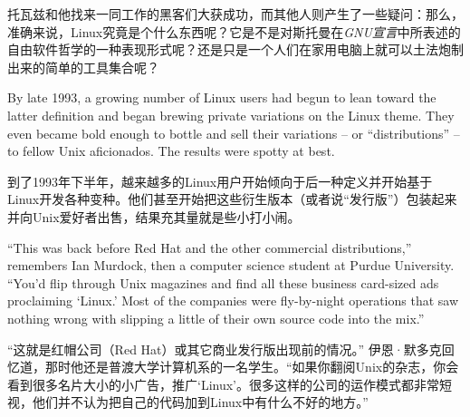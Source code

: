 \ifdefined\chs
托瓦兹和他找来一同工作的黑客们大获成功，而其他人则产生了一些疑问：那么，准确来说，Linux究竟是个什么东西呢？它是不是对斯托曼在\textit{GNU宣言}中所表述的自由软件哲学的一种表现形式呢？还是只是一个人们在家用电脑上就可以土法炮制出来的简单的工具集合呢？
\fi

\ifdefined\eng
By late 1993, a growing number of Linux users had begun to lean toward the latter definition and began brewing private variations on the Linux theme. They even became bold enough to bottle and sell their variations -- or ``distributions'' -- to fellow Unix aficionados. The results were spotty at best.
\fi

\ifdefined\chs
到了1993年下半年，越来越多的Linux用户开始倾向于后一种定义并开始基于Linux开发各种变种。他们甚至开始把这些衍生版本（或者说``发行版''）包装起来并向Unix爱好者出售，结果充其量就是些小打小闹。
\fi

\ifdefined\eng
``This was back before Red Hat and the other commercial distributions,'' remembers Ian Murdock, then a computer science student at Purdue University. ``You'd flip through Unix magazines and find all these business card-sized ads proclaiming `Linux.' Most of the companies were fly-by-night operations that saw nothing wrong with slipping a little of their own source code into the mix.''
\fi

\ifdefined\chs
``这就是红帽公司（Red Hat）或其它商业发行版出现前的情况。'' 伊恩·默多克回忆道，那时他还是普渡大学计算机系的一名学生。``如果你翻阅Unix的杂志，你会看到很多名片大小的小广告，推广`Linux'。很多这样的公司的运作模式都非常短视，他们并不认为把自己的代码加到Linux中有什么不好的地方。''
\fi

